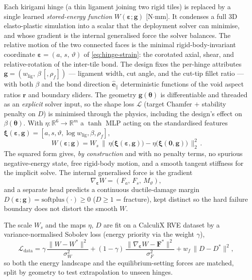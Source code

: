 \documentclass[pdflatex,sn-mathphys-num]{sn-jnl}%
\theoremstyle{thmstyleone}%
\theoremstyle{thmstyletwo}%
\theoremstyle{thmstylethree}%
\begin{document}
Each kirigami hinge (a thin ligament joining two rigid tiles) is replaced by a
single learned \emph{stored-energy function} $W(\bm{\varepsilon};\bm{g})$
[N$\cdot$mm]. It condenses a full 3D elasto-plastic simulation into a scalar that
the deployment solver can minimise, and whose gradient is the internal generalised
force the solver balances. The relative motion of the two connected faces is the
minimal rigid-body-invariant coordinate $\bm{\varepsilon}=(a,\,s,\,\vartheta)$ of
\eqref{eq:hinge-strain}: the corotated axial, shear, and relative-rotation of the
inter-tile bond. The design fixes the per-hinge attributes
$\bm{g}=(w_{\mathrm{lig}},\,\beta\,[,\rho_f])$ --- ligament width, cut angle, and
the cut-tip fillet ratio --- with both $\beta$ and the bond direction
$\hat{\bm{e}}_\parallel$ deterministic functions of the void aspect ratios
$\bm{r}$ and boundary sliders. The geometry $\bm{g}(\bm{\theta})$ is differentiable
and threaded as an \emph{explicit} solver input, so the shape loss $\mathcal{L}$
(target Chamfer $+$ stability penalty on $D$) is minimised through the physics,
including the design's effect on $\beta(\bm{\theta})$. With
$\eta:\mathbb{R}^{6}\!\to\mathbb{R}^m$ a $\tanh$ MLP acting on the standardised
features
$\bm{\xi}(\bm{\varepsilon},\bm{g})=[a,s,\vartheta,\log w_{\mathrm{lig}},\beta,\rho_f]$,
\begin{equation}
  \boxed{\,W(\bm{\varepsilon};\bm{g})
    = W_{s}\,\bigl\|\,\eta\bigl(\bm{\xi}(\bm{\varepsilon},\bm{g})\bigr)
      -\eta\bigl(\bm{\xi}(\bm{0},\bm{g})\bigr)\,\bigr\|_2^2\,}.
  \label{eq:surrogate}
\end{equation}
The squared form gives, \emph{by construction} and with no penalty terms, no
spurious negative-energy state, free rigid-body motion, and a smooth tangent
stiffness for the implicit solve. The internal generalised force is the gradient
\begin{equation}
  \nabla_{\bm{\varepsilon}}W=(F_a,\,F_s,\,M_\vartheta),
\end{equation}
and a separate head predicts a continuous ductile-damage margin
$D(\bm{\varepsilon};\bm{g})=\mathrm{softplus}(\cdot)\ge 0$ ($D\!\ge\!1$ =
fracture), kept distinct so the hard failure boundary does not distort the smooth
$W$.

The scale $W_{s}$ and the maps $\eta,\,D$ are fit on a CalculiX RVE dataset by a
variance-normalised Sobolev loss (energy priority via the weight $\gamma$),
\begin{equation}
  \mathcal{L}_{\mathrm{data}}
  =\gamma\,\frac{\|W-W^\ast\|^2}{\sigma_W^2}
  +(1-\gamma)\,\frac{\|\nabla_{\bm{\varepsilon}}W-\bm{F}^\ast\|^2}{\sigma_F^2}
  +w_f\,\|D-D^\ast\|^2,
\end{equation}
so both the energy landscape and the equilibrium-setting forces are matched, split
by geometry to test extrapolation to unseen hinges.
\end{document}
